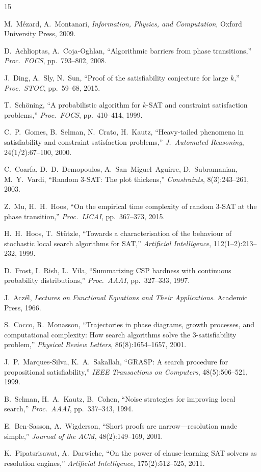 \documentclass[11pt,a4paper]{article}
\begin{document}
\begin{thebibliography}{15}

M.~M\'ezard, A.~Montanari,
\textit{Information, Physics, and Computation},
Oxford University Press, 2009.

D.~Achlioptas, A.~Coja-Oghlan,
``Algorithmic barriers from phase transitions,''
\textit{Proc.\ FOCS}, pp.~793--802, 2008.

J.~Ding, A.~Sly, N.~Sun,
``Proof of the satisfiability conjecture for large $k$,''
\textit{Proc.\ STOC}, pp.~59--68, 2015.

T.~Sch\"oning,
``A probabilistic algorithm for $k$-SAT and constraint
satisfaction problems,''
\textit{Proc.\ FOCS}, pp.~410--414, 1999.

C.~P.~Gomes, B.~Selman, N.~Crato, H.~Kautz,
``Heavy-tailed phenomena in satisfiability and constraint
satisfaction problems,''
\textit{J.~Automated Reasoning}, 24(1/2):67--100, 2000.

C.~Coarfa, D.~D.~Demopoulos, A.~San~Miguel~Aguirre, D.~Subramanian, M.~Y.~Vardi,
``Random 3-SAT: The plot thickens,''
\textit{Constraints}, 8(3):243--261, 2003.

Z.~Mu, H.~H.~Hoos,
``On the empirical time complexity of random 3-SAT at the phase transition,''
\textit{Proc.\ IJCAI}, pp.~367--373, 2015.

H.~H.~Hoos, T.~St\"utzle,
``Towards a characterisation of the behaviour of stochastic local
search algorithms for SAT,''
\textit{Artificial Intelligence}, 112(1--2):213--232, 1999.

D.~Frost, I.~Rish, L.~Vila,
``Summarizing CSP hardness with continuous probability distributions,''
\textit{Proc.\ AAAI}, pp.~327--333, 1997.

J.~Acz\'el,
\textit{Lectures on Functional Equations and Their Applications}.
Academic Press, 1966.

S.~Cocco, R.~Monasson,
``Trajectories in phase diagrams, growth processes, and
computational complexity: How search algorithms solve the
3-satisfiability problem,''
\textit{Physical Review Letters}, 86(8):1654--1657, 2001.

J.~P.~Marques-Silva, K.~A.~Sakallah,
``GRASP: A search procedure for propositional satisfiability,''
\textit{IEEE Transactions on Computers}, 48(5):506--521, 1999.

B.~Selman, H.~A.~Kautz, B.~Cohen,
``Noise strategies for improving local search,''
\textit{Proc.\ AAAI}, pp.~337--343, 1994.

E.~Ben-Sasson, A.~Wigderson,
``Short proofs are narrow---resolution made simple,''
\textit{Journal of the ACM}, 48(2):149--169, 2001.

K.~Pipatsrisawat, A.~Darwiche,
``On the power of clause-learning SAT solvers as resolution engines,''
\textit{Artificial Intelligence}, 175(2):512--525, 2011.

\end{thebibliography}
\end{document}
